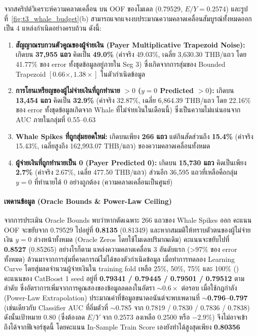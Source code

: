 จากสคริปต์วิเคราะห์ความคลาดเคลื่อน  บน OOF ของโมเดล  (0.79529, $E/Y = 0.2574$) และรูปที่~\ref{fig:t3_whale_budget}(b) สามารถแจกแจงงบประมาณความคลาดเคลื่อนสัมบูรณ์ทั้งหมดออกเป็น 4 แหล่งกำเนิดอย่างครบถ้วน ดังนี้:
\begin{enumerate}
    \item \textbf{สัญญาณรบกวนตัวคูณของผู้จ่ายเงิน (Payer Multiplicative Trapezoid Noise):} เกิดบน \textbf{37,955 แถว} คิดเป็น \textbf{49.0\%} (ค่าจริง 49.03\%, เฉลี่ย 3,630.30 THB/แถว โดย 41.77\% ของ error ทั้งชุดข้อมูลอยู่ภายใน Seg 3) ซึ่งเกิดจากการสุ่มของ Bounded Trapezoid $[0.66\times, 1.38\times]$ ในตัวกำเนิดข้อมูล
    \item \textbf{การโยนเหรียญของผู้ไม่จ่ายเงินที่ถูกทำนาย $> 0$ ($y = 0$ Predicted $> 0$):} เกิดบน \textbf{13,454 แถว} คิดเป็น \textbf{32.9\%} (ค่าจริง 32.87\%, เฉลี่ย 6,864.39 THB/แถว โดย 22.16\% ของ error ทั้งชุดข้อมูลเกิดจาก Whale ที่ไม่จ่ายเงินในเดือนนี้) ซึ่งเป็นความไม่แน่นอนจาก AUC ภายในกลุ่มที่ 0.55--0.63
    \item \textbf{Whale Spikes ที่ถูกสุ่มยอดใหม่:} เกิดบนเพียง \textbf{266 แถว} แต่กินสัดส่วนถึง \textbf{15.4\%} (ค่าจริง 15.43\%, เฉลี่ยสูงถึง 162,993.07 THB/แถว) ของความคลาดเคลื่อนทั้งหมด
    \item \textbf{ผู้จ่ายเงินที่ถูกทำนายเป็น 0 (Payer Predicted 0):} เกิดบน \textbf{15,730 แถว} คิดเป็นเพียง \textbf{2.7\%} (ค่าจริง 2.67\%, เฉลี่ย 477.50 THB/แถว) ส่วนอีก 36,595 แถวที่เหลือคือกลุ่ม $y = 0$ ที่ทำนายได้ 0 อย่างถูกต้อง (ความคลาดเคลื่อนเป็นศูนย์)
\end{enumerate}

\paragraph{เพดานข้อมูล (Oracle Bounds \& Power-Law Ceiling)}
จากการประเมิน Oracle Bounds พบว่าหากตัดเฉพาะ 266 แถวของ Whale Spikes ออก คะแนน OOF จะขยับจาก 0.79529 ไปอยู่ที่ \textbf{0.8135} (0.81349) และหากสมมติให้ทราบตัวตนของผู้ไม่จ่ายเงิน $y = 0$ ล่วงหน้าทั้งหมด (Oracle Zeros โดยใช้โมเดลปริมาณเดิม) คะแนนจะขยับไปที่ \textbf{0.8527} (0.85265) อย่างไรก็ตาม แหล่งความคลาดเคลื่อน 3 อันดับแรก (>97\% ของ error ทั้งหมด) ล้วนมาจากการสุ่มที่คาดการณ์ไม่ได้ของตัวกำเนิดข้อมูล เมื่อทำการทดลอง Learning Curve โดยสุ่มลดจำนวนผู้จ่ายเงินใน training fold เหลือ 25\%, 50\%, 75\% และ 100\% () คะแนนของ CatBoost  1 seed อยู่ที่ \textbf{0.79341 / 0.79445 / 0.79501 / 0.79512} ตามลำดับ ซึ่งอัตราการเพิ่มจากการคูณสองของข้อมูลลดลงในอัตรา $\sim 0.6\times$ ต่อรอบ เมื่อใช้กฎกำลัง (Power-Law Extrapolation) ประมาณค่าที่ข้อมูลขนาดอนันต์จะพบเพดานที่ \textbf{$\sim$0.796--0.797} (เช่นเดียวกับ Classifier AUC ที่อิ่มตัวที่ $\sim$0.785 จาก 0.7819 / 0.7830 / 0.7836 / 0.7838) ดังนั้นเป้าหมาย 0.80 (ซึ่งต้องลด $E/Y$ จาก 0.2573 ลงเหลือ 0.2500 หรือ $-2.9\%$) จึงไม่อาจเข้าถึงได้จากฟีเจอร์ชุดนี้ โดยคะแนน In-Sample Train Score เองยังทำได้สูงสุดเพียง \textbf{0.80356}

